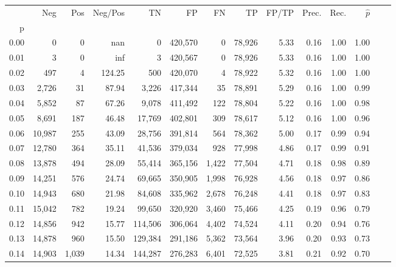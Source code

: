 \begin{tabular}{rrrrrrrrrrrrrr}
\toprule
{} &     Neg &    Pos & Neg/Pos &       TN &       FP &      FN &      TP & FP/TP & Prec. &  Rec. & $\hat{p}$ \\
p    &         &        &         &          &          &         &         &       &       &       &           \\
\midrule
0.00 &       0 &      0 &     nan &        0 &  420,570 &       0 &  78,926 &  5.33 &  0.16 &  1.00 &      1.00 \\
0.01 &       3 &      0 &     inf &        3 &  420,567 &       0 &  78,926 &  5.33 &  0.16 &  1.00 &      1.00 \\
0.02 &     497 &      4 &  124.25 &      500 &  420,070 &       4 &  78,922 &  5.32 &  0.16 &  1.00 &      1.00 \\
0.03 &   2,726 &     31 &   87.94 &    3,226 &  417,344 &      35 &  78,891 &  5.29 &  0.16 &  1.00 &      0.99 \\
0.04 &   5,852 &     87 &   67.26 &    9,078 &  411,492 &     122 &  78,804 &  5.22 &  0.16 &  1.00 &      0.98 \\
0.05 &   8,691 &    187 &   46.48 &   17,769 &  402,801 &     309 &  78,617 &  5.12 &  0.16 &  1.00 &      0.96 \\
0.06 &  10,987 &    255 &   43.09 &   28,756 &  391,814 &     564 &  78,362 &  5.00 &  0.17 &  0.99 &      0.94 \\
0.07 &  12,780 &    364 &   35.11 &   41,536 &  379,034 &     928 &  77,998 &  4.86 &  0.17 &  0.99 &      0.91 \\
0.08 &  13,878 &    494 &   28.09 &   55,414 &  365,156 &   1,422 &  77,504 &  4.71 &  0.18 &  0.98 &      0.89 \\
0.09 &  14,251 &    576 &   24.74 &   69,665 &  350,905 &   1,998 &  76,928 &  4.56 &  0.18 &  0.97 &      0.86 \\
0.10 &  14,943 &    680 &   21.98 &   84,608 &  335,962 &   2,678 &  76,248 &  4.41 &  0.18 &  0.97 &      0.83 \\
0.11 &  15,042 &    782 &   19.24 &   99,650 &  320,920 &   3,460 &  75,466 &  4.25 &  0.19 &  0.96 &      0.79 \\
0.12 &  14,856 &    942 &   15.77 &  114,506 &  306,064 &   4,402 &  74,524 &  4.11 &  0.20 &  0.94 &      0.76 \\
0.13 &  14,878 &    960 &   15.50 &  129,384 &  291,186 &   5,362 &  73,564 &  3.96 &  0.20 &  0.93 &      0.73 \\
0.14 &  14,903 &  1,039 &   14.34 &  144,287 &  276,283 &   6,401 &  72,525 &  3.81 &  0.21 &  0.92 &      0.70 \\

\end{tabular}
